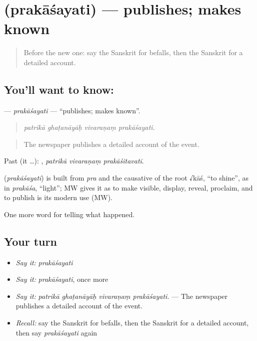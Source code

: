 \section[\texorpdfstring{\sk{प्रकाशयति} (prakāśayati)}{प्रकाशयति (prakāśayati)}]{ (prakāśayati) — publishes; makes known}

\label{lesson:SA-C310-prakasayati}



\begin{quote}
Before the new one: say the Sanskrit for befalls, then the Sanskrit for a detailed account.
\end{quote}

\subsection*{You'll want to know: }
\textbf{} — \emph{prakāśayati} — \textquotedblleft{}publishes; makes known\textquotedblright{}.

\begin{quote}
   
\end{quote}

\begin{quote}
\emph{patrikā ghaṭanāyāḥ vivaraṇaṃ prakāśayati.}
\end{quote}

\begin{quote}
The newspaper publishes a detailed account of the event.
\end{quote}

Past (it …):   , \emph{patrikā vivaraṇaṃ prakāśitavatī}.

\begin{cousinweb}
\textbf{} (\emph{prakāśayati}) is built from \emph{pra} and the causative of the root √kāś, \textquotedblleft{}to shine\textquotedblright{}, as in \emph{prakāśa}, \textquotedblleft{}light\textquotedblright{}; MW gives it as to make visible, display, reveal, proclaim, and to publish is its modern use (MW).
\end{cousinweb}

\begin{grammarlens}[title={What you've built}]
One more word for telling what happened.
\end{grammarlens}

\subsection*{Your turn}
\begin{itemize}
\raggedright
  \item \emph{Say it:} \emph{prakāśayati}
  \item \emph{Say it:} \emph{prakāśayati}, once more
  \item \emph{Say it:} \emph{patrikā ghaṭanāyāḥ vivaraṇaṃ prakāśayati.} — The newspaper publishes a detailed account of the event.
  \item \emph{Recall:} say the Sanskrit for befalls, then the Sanskrit for a detailed account, then say \emph{prakāśayati} again
\end{itemize}

